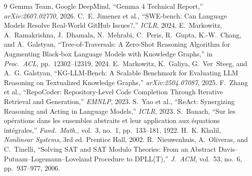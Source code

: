 \documentclass[10pt,twocolumn]{article}
\begin{document}
\begin{thebibliography}{9}
 Gemma Team, Google DeepMind, ``Gemma 4 Technical Report,'' \emph{arXiv:2607.02770}, 2026.
 C.~E. Jimenez et al., ``SWE-bench: Can Language Models Resolve Real-World GitHub Issues?,'' \emph{ICLR}, 2024.
 E.~Markowitz, A.~Ramakrishna, J.~Dhamala, N.~Mehrabi, C.~Peris, R.~Gupta, K.-W.~Chang, and A.~Galstyan, ``Tree-of-Traversals: A Zero-Shot Reasoning Algorithm for Augmenting Black-box Language Models with Knowledge Graphs,'' in \emph{Proc.\ ACL}, pp.\ 12302--12319, 2024.
 E.~Markowitz, K.~Galiya, G.~Ver~Steeg, and A.~G. Galstyan, ``KG-LLM-Bench: A Scalable Benchmark for Evaluating LLM Reasoning on Textualized Knowledge Graphs,'' \emph{arXiv:2504.07087}, 2025.
 F.~Zhang et al., ``RepoCoder: Repository-Level Code Completion Through Iterative Retrieval and Generation,'' \emph{EMNLP}, 2023.
 S.~Yao et al., ``ReAct: Synergizing Reasoning and Acting in Language Models,'' \emph{ICLR}, 2023.
 S.~Banach, ``Sur les op\'erations dans les ensembles abstraits et leur application aux \'equations int\'egrales,'' \emph{Fund.\ Math.}, vol.~3, no.~1, pp.~133--181, 1922.
 H.~K. Khalil, \emph{Nonlinear Systems}, 3rd ed. Prentice Hall, 2002.
 R.~Nieuwenhuis, A.~Oliveras, and C.~Tinelli, ``Solving SAT and SAT Modulo Theories: From an Abstract Davis--Putnam--Logemann--Loveland Procedure to DPLL(T),'' \emph{J.\ ACM}, vol.~53, no.~6, pp.~937--977, 2006.
\end{thebibliography}
\end{document}

